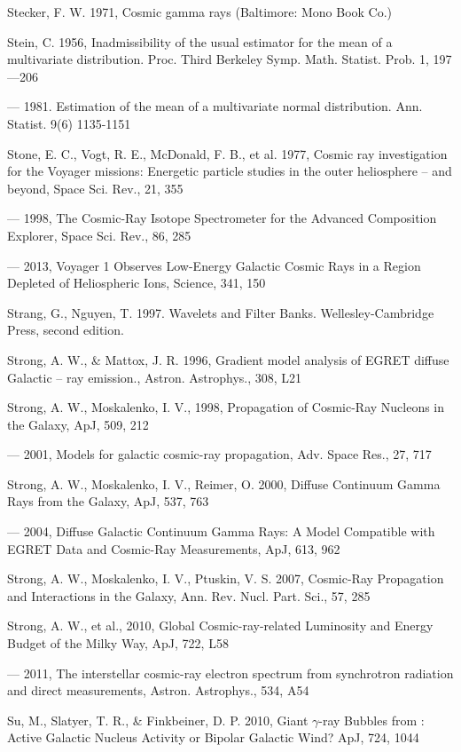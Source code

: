 Stecker, F. W. 1971, Cosmic gamma rays (Baltimore: Mono Book Co.)

Stein, C. 1956, Inadmissibility of the usual estimator for the mean of a multivariate distribution. Proc. Third Berkeley Symp. Math. Statist. Prob. 1, 197---206

--- 1981. Estimation of the mean of a multivariate normal distribution. Ann. Statist. 9(6) 1135-1151

Stone, E. C., Vogt, R. E., McDonald, F. B., et al. 1977, Cosmic ray investigation for the Voyager missions: Energetic particle studies in the outer heliosphere -- and beyond, Space Sci. Rev., 21, 355

--- 1998, The Cosmic-Ray Isotope Spectrometer for the Advanced Composition Explorer, Space Sci. Rev., 86, 285

--- 2013, Voyager 1 Observes Low-Energy Galactic Cosmic Rays in a Region Depleted of Heliospheric Ions, Science, 341, 150

Strang, G., Nguyen, T. 1997. Wavelets and Filter Banks. Wellesley-Cambridge Press, second edition.

Strong, A. W., \& Mattox, J. R. 1996, Gradient model analysis of EGRET diffuse Galactic -- ray emission., Astron. Astrophys., 308, L21

Strong, A. W., Moskalenko, I. V., 1998, Propagation of Cosmic-Ray Nucleons in the Galaxy, ApJ, 509, 212

--- 2001, Models for galactic cosmic-ray propagation, Adv. Space Res., 27, 717

Strong, A. W., Moskalenko, I. V., Reimer, O. 2000, Diffuse Continuum Gamma Rays from the Galaxy, ApJ, 537, 763

--- 2004, Diffuse Galactic Continuum Gamma Rays: A Model Compatible with EGRET Data and Cosmic-Ray Measurements, ApJ, 613, 962

Strong, A. W., Moskalenko, I. V., Ptuskin, V. S. 2007, Cosmic-Ray Propagation and Interactions in the Galaxy, Ann. Rev. Nucl. Part. Sci., 57, 285

Strong, A. W., et al., 2010, Global Cosmic-ray-related Luminosity and Energy Budget of the Milky Way, ApJ, 722, L58

--- 2011, The interstellar cosmic-ray electron spectrum from synchrotron radiation and direct measurements, Astron. Astrophys., 534, A54

Su, M., Slatyer, T. R., \& Finkbeiner, D. P. 2010, Giant $\gamma$-ray Bubbles from \fermilat{}: Active Galactic Nucleus Activity or Bipolar Galactic Wind? ApJ, 724, 1044

